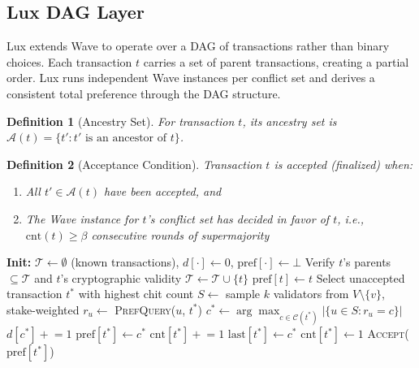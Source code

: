\documentclass[11pt,a4paper]{article}
\newtheorem{definition}{Definition}[section]
\begin{document}
\subsection{Lux DAG Layer}

Lux extends Wave to operate over a DAG of transactions rather than binary choices.
Each transaction $t$ carries a set of parent transactions, creating a partial order. Lux
runs independent Wave instances per conflict set and derives a consistent total
preference through the DAG structure.

\begin{definition}[Ancestry Set]
For transaction $t$, its ancestry set is $\mathcal{A}(t) = \{t' : t' \text{ is an ancestor of } t\}$.
\end{definition}

\begin{definition}[Acceptance Condition]
Transaction $t$ is accepted (finalized) when:
\begin{enumerate}
\item All $t' \in \mathcal{A}(t)$ have been accepted, and
\item The Wave instance for $t$'s conflict set has decided in favor of $t$,
i.e., $\text{cnt}(t) \geq \beta$ consecutive rounds of supermajority
\end{enumerate}
\end{definition}

\begin{algorithm}
\caption{Lux: DAG-Based Consensus}
\label{alg:lux}
\begin{algorithmic}[1]
\State \textbf{Init:} $\mathcal{T} \leftarrow \emptyset$ (known transactions), $d[\cdot] \leftarrow 0$, $\text{pref}[\cdot] \leftarrow \bot$
    \State Verify $t$'s parents $\subseteq \mathcal{T}$ and $t$'s cryptographic validity
    \State $\mathcal{T} \leftarrow \mathcal{T} \cup \{t\}$
    \State $\text{pref}[t] \leftarrow t$ 
\EndProcedure
{}
        \State Select unaccepted transaction $t^*$ with highest chit count
        \State $S \leftarrow$ sample $k$ validators from $V \setminus \{v\}$, stake-weighted
            \State $r_u \leftarrow$ \textsc{PrefQuery}($u$, $t^*$)
        \EndFor
        \State $c^* \leftarrow \arg\max_{c \in \mathcal{C}(t^*)} |\{u \in S : r_u = c\}|$
            \State $d[c^*] \mathrel{+}= 1$
                \State $\text{pref}[t^*] \leftarrow c^*$
            \EndIf
                \State $\text{cnt}[t^*] \mathrel{+}= 1$
            \Else
                \State $\text{last}[t^*] \leftarrow c^*$
                \State $\text{cnt}[t^*] \leftarrow 1$
            \EndIf
                \State \textsc{Accept}($\text{pref}[t^*]$)
            \EndIf
        \EndIf
    \EndWhile
\EndProcedure
\end{algorithmic}
\end{algorithm}
\end{document}
